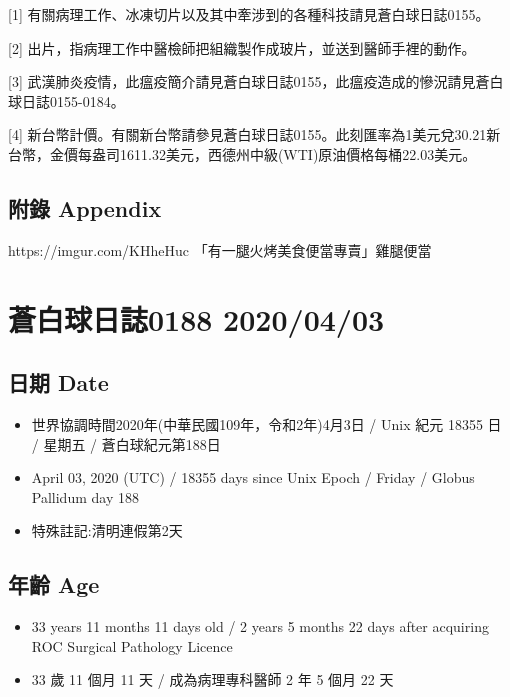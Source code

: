 \documentclass[a5paper, 12pt
]{book}
\providecommand{\tightlist}{%
  \setlength{\itemsep}{0pt}\setlength{\parskip}{0pt}}
\begin{document}
{[}1{]}
有關病理工作、冰凍切片以及其中牽涉到的各種科技請見蒼白球日誌0155。

{[}2{]} 出片，指病理工作中醫檢師把組織製作成玻片，並送到醫師手裡的動作。

{[}3{]}
武漢肺炎疫情，此瘟疫簡介請見蒼白球日誌0155，此瘟疫造成的慘況請見蒼白球日誌0155-0184。

{[}4{]}
新台幣計價。有關新台幣請參見蒼白球日誌0155。此刻匯率為1美元兌30.21新台幣，金價每盎司1611.32美元，西德州中級(WTI)原油價格每桶22.03美元。

\hypertarget{ux9644ux9304-appendix-32}{%
\subsection{附錄 Appendix}\label{ux9644ux9304-appendix-32}}

https://imgur.com/KHheHuc 「有一腿火烤美食便當專賣」雞腿便當

\hypertarget{ux84bcux767dux7403ux65e5ux8a8c0188-20200403}{%
\section{蒼白球日誌0188
2020/04/03}\label{ux84bcux767dux7403ux65e5ux8a8c0188-20200403}}

\hypertarget{ux65e5ux671f-date-33}{%
\subsection{日期 Date}\label{ux65e5ux671f-date-33}}

\begin{itemize}
\tightlist
\item
  世界協調時間2020年(中華民國109年，令和2年)4月3日 / Unix 紀元 18355 日
  / 星期五 / 蒼白球紀元第188日
\item
  April 03, 2020 (UTC) / 18355 days since Unix Epoch / Friday / Globus
  Pallidum day 188
\item
  特殊註記:清明連假第2天
\end{itemize}

\hypertarget{ux5e74ux9f61-age-33}{%
\subsection{年齡 Age}\label{ux5e74ux9f61-age-33}}

\begin{itemize}
\tightlist
\item
  33 years 11 months 11 days old / 2 years 5 months 22 days after
  acquiring ROC Surgical Pathology Licence
\item
  33 歲 11 個月 11 天 / 成為病理專科醫師 2 年 5 個月 22 天
\end{itemize}
\end{document}
